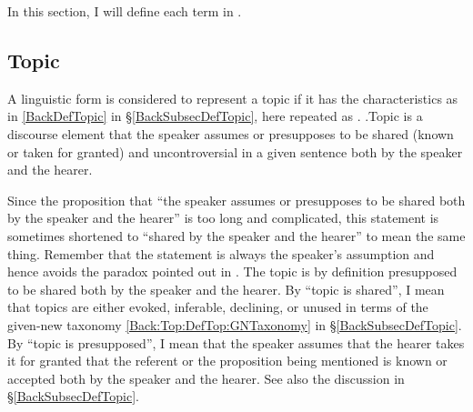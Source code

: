 In this section,
I will define each term in \Last.

\subsection{Topic}\label{FrameworkTopic}

A linguistic form is considered to represent a topic
if it has the characteristics as in \ref{BackDefTopic} in \S \ref{BackSubsecDefTopic},
here repeated as \Next.
%
\ex.\label{FrameworkTopicDef}Topic is a discourse element that the speaker assumes or presupposes to be shared (known or taken for granted) and uncontroversial in a given sentence both by the speaker and the hearer.

%
Since the proposition that ``the speaker assumes or presupposes to be shared both by the speaker and the hearer'' is too long and complicated,
this statement is sometimes shortened to ``shared by the speaker and the hearer'' to mean the same thing.
Remember that the statement is always the speaker's assumption
and hence avoids the paradox pointed out in .
The topic is by definition presupposed to be shared both by the speaker and the hearer.
By ``topic is shared'',
I mean that topics are either evoked, inferable, declining, or unused
in terms of the given-new taxonomy \ref{Back:Top:DefTop:GNTaxonomy} in \S \ref{BackSubsecDefTopic}.
By ``topic is presupposed'',
I mean that the speaker assumes that the hearer takes it for granted that the referent or the proposition being mentioned is known or accepted both by the speaker and the hearer.
See also the discussion in \S \ref{BackSubsecDefTopic}.

